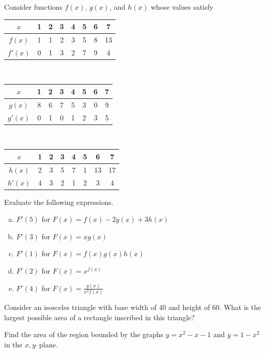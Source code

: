 \documentclass[11pt]{exam}
\theoremstyle{definition}
\begin{document}
\begin{questions}
\newpage
\question[10]\mbox{}
Consider functions $f(x)$, $g(x)$, and $h(x)$ whose values satisfy
\begin{center}
\begin{tabular}{c|c|c|c|c|c|c|c}
$x$ & 1 & 2 & 3 & 4 & 5 & 6 & 7\\\hline
$f(x)$ & 1 & 1 & 2 & 3 & 5 & 8 & 13\\\hline
$f'(x)$ & 0 & 1 & 3 & 2 & 7 & 9 & 4\\\hline
\end{tabular}\\
\vspace{0.3in}
\begin{tabular}{c|c|c|c|c|c|c|c}
$x$ & 1 & 2 & 3 & 4 & 5 & 6 & 7\\\hline
$g(x)$ & 8 & 6 & 7 & 5 & 3 & 0 & 9\\\hline
$g'(x)$ & 0 & 1 & 0 & 1 & 2 & 3 & 5
\end{tabular}\\
\vspace{0.3in}
\begin{tabular}{c|c|c|c|c|c|c|c}
$x$ & 1 & 2 & 3 & 4 & 5 & 6 & 7\\\hline
$h(x)$ & 2 & 3 & 5 & 7 & 1 & 13 & 17\\\hline
$h'(x)$ & 4 & 3 & 2 & 1 & 2 & 3 & 4
\end{tabular}
\end{center}
Evaluate the following expressions.
\begin{enumerate}[(a)]
\item $F'(5)$ for $F(x) = f(x) - 2g(x) + 3h(x)$
\vspace{1in}
\item $F'(3)$ for $F(x) = xg(x)$
\vspace{1in}
\item $F'(1)$ for $F(x) = f(x)g(x)h(x)$
\vspace{1in}
\item $F'(2)$ for $F(x) = x^{f(x)}$
\vspace{1in}
\item $F'(4)$ for $F(x) = \frac{g(x)}{x^2f(x)}$
\end{enumerate}

\newpage
\question[10]
Consider an isosceles triangle with base width of $40$ and height of $60$.
What is the largest possible area of a rectangle inscribed in this triangle?

\newpage
\question[10]
Find the area of the region bounded by the graphs $y=x^2-x-1$ and $y=1-x^2$ in the $x,y$--plane.


\end{questions}
\end{document}
